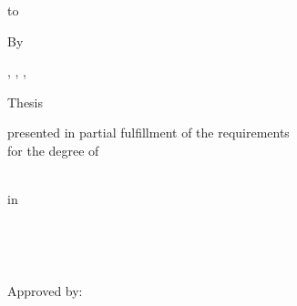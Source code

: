 

\begin{titlepage}
	\vbox to \textheight
	{
		\begin{center}
		{\bfseries \mytitlecaps}
		\vskip 11pt
		
				By \\
		\vskip 11pt
		
		\me
		\vskip 11pt
		
		\myprevdegree, \myprevcollege, \myprevlocation, \myprevdegdate
		
		\vskip 11pt
		
		Thesis \\ 
		
		\vskip 11pt
		
		\begin{singlespace}
				presented in partial fulfillment of the requirements \\
				for the degree of
		\end{singlespace}
		
		\vskip 11pt
		
		\begin{singlespace}
		
				\mycurrentdegree \\ 
				in \mymajordept
		
		\end{singlespace}
		
		\vskip 11pt
		
		\begin{singlespace}
		\college \\ 
		\location
		\end{singlespace}
		\mygradsemester \  \mygradyear
		\vskip 11pt
		
		Approved by: \\
		

\end{center}}
\end{titlepage}
